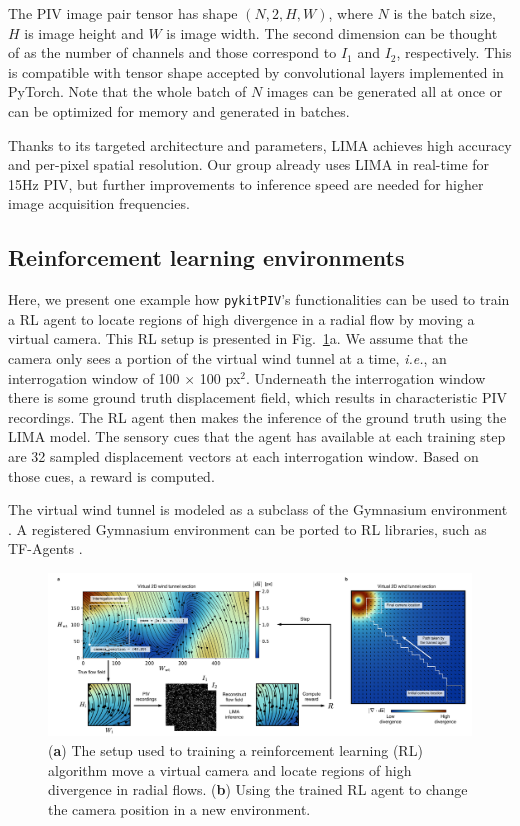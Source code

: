 \documentclass[a4paper,fleqn]{cas-dc}
\begin{document}
The PIV image pair tensor has shape $(N, 2, H, W)$, where $N$ is the batch size, $H$ is image height and $W$ is image width. The second dimension can be thought of as the number of channels and those correspond to $I_1$ and $I_2$, respectively. This is compatible with tensor shape accepted by convolutional layers implemented in PyTorch. Note that the whole batch of $N$ images can be generated all at once or can be optimized for memory and generated in batches. 

Thanks to its targeted architecture and parameters, LIMA achieves high accuracy and per-pixel spatial resolution. Our group already uses LIMA in real-time for 15Hz PIV, but further improvements to inference speed are needed for higher image acquisition frequencies.

\subsection{Reinforcement learning environments}

Here, we present one example how \texttt{pykitPIV}'s functionalities can be used to train a RL agent to locate regions of high divergence in a radial flow by moving a virtual camera. This RL setup is presented in Fig.~\ref{fig:RL}a. We assume that the camera only sees a portion of the virtual wind tunnel at a time, \textit{i.e.}, an interrogation window of 100 $\times$ 100 px$^2$. Underneath the interrogation window there is some ground truth displacement field, which results in characteristic PIV recordings. The RL agent then makes the inference of the ground truth using the LIMA model. The sensory cues that the agent has available at each training step are 32 sampled displacement vectors at each interrogation window. Based on those cues, a reward is computed.

The virtual wind tunnel is modeled as a subclass of the Gymnasium environment \cite{brockman2016openai}. A registered Gymnasium environment can be ported to RL libraries, such as TF-Agents \cite{TFAgents}. 

\begin{figure}[t]
\centering
\vspace{-0.4 in}
\includegraphics[width=\textwidth]{RL.pdf}
\vspace{10 pt}
\caption{\footnotesize (\textbf{a}) The setup used to training a reinforcement learning (RL) algorithm move a virtual camera and locate regions of high divergence in radial flows. (\textbf{b}) Using the trained RL agent to change the camera position in a new environment.}
\label{fig:RL}
\end{figure}
\end{document}

